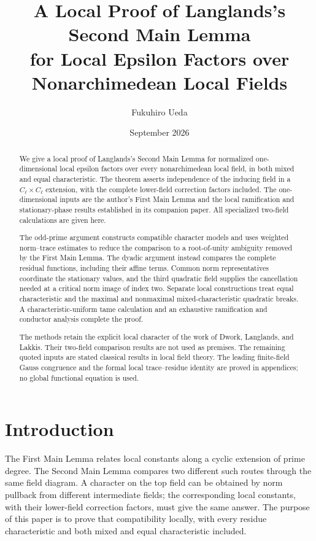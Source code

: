 \documentclass[11pt]{amsart}
\title[The Second Main Lemma for Local Epsilon Factors]
{A Local Proof of Langlands's Second Main Lemma\\
for Local Epsilon Factors over Nonarchimedean Local Fields}
\author{Fukuhiro Ueda}
\date{September 2026}
\theoremstyle{definition}
\theoremstyle{remark}
\begin{document}
\begin{abstract}
We give a local proof of Langlands's Second Main Lemma for normalized
one-dimensional local epsilon factors over every nonarchimedean local
field, in both mixed and equal characteristic. The theorem asserts
independence of the inducing field in a $C_\ell\times C_\ell$ extension,
with the complete lower-field correction factors included. The
one-dimensional inputs are the author's First Main Lemma and the local
ramification and stationary-phase results established in its companion
paper. All specialized two-field calculations are given here.

The odd-prime argument constructs compatible character models and uses
weighted norm--trace estimates to reduce the comparison to a root-of-unity
ambiguity removed by the First Main Lemma. The dyadic argument instead
compares the complete residual functions, including their affine terms.
Common norm representatives coordinate the stationary values, and the
third quadratic field supplies the cancellation needed at a critical
norm image of index two. Separate local constructions treat equal
characteristic and the maximal and nonmaximal mixed-characteristic
quadratic breaks. A characteristic-uniform tame calculation and an
exhaustive ramification and conductor analysis complete the proof.

The methods retain the explicit local character of the work of Dwork,
Langlands, and Lakkis. Their two-field comparison results are not used as
premises. The remaining quoted inputs are stated classical results in
local field theory. The leading finite-field Gauss congruence and the
formal local trace--residue identity are proved in appendices; no global
functional equation is used.
\end{abstract}
\maketitle
\clearpage
\begingroup
\raggedbottom
\tableofcontents
\clearpage
\endgroup

\section{Introduction}\label{sec:introduction}
The First Main Lemma relates local constants along a cyclic extension
of prime degree. The Second Main Lemma compares two different such
routes through the same field diagram. A character on the top field
can be obtained by norm pullback from different intermediate fields;
the corresponding local constants, with their lower-field correction
factors, must give the same answer. The purpose of this paper is to
prove that compatibility locally, with every residue characteristic and
both mixed and equal characteristic included.
\end{document}
